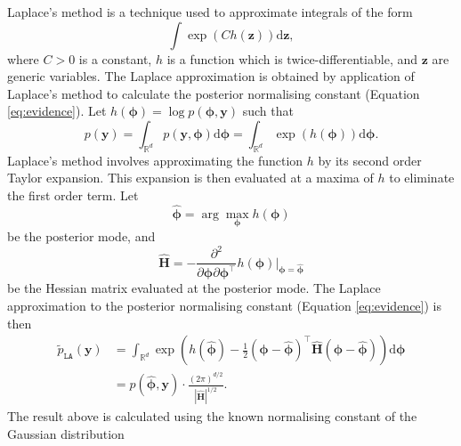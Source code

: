 \documentclass[a4paper, nobind]{templates/ociamthesis}
\begin{document}
Laplace's method \autocite{laplace1774memoire} is a technique used to approximate integrals of the form
\begin{equation}
\int \exp(C h(\mathbf{z})) \text{d}\mathbf{z},
\end{equation}
where \(C > 0\) is a constant, \(h\) is a function which is twice-differentiable, and \(\mathbf{z}\) are generic variables.
The Laplace approximation \autocite{tierney1986accurate} is obtained by application of Laplace's method to calculate the posterior normalising constant (Equation \eqref{eq:evidence}).
Let \(h(\boldsymbol{\mathbf{\phi}}) = \log p(\boldsymbol{\mathbf{\phi}}, \mathbf{y})\) such that
\begin{equation}
p(\mathbf{y}) = \int_{\mathbb{R}^d} p(\mathbf{y}, \boldsymbol{\mathbf{\phi}}) \text{d}\boldsymbol{\mathbf{\phi}} = \int_{\mathbb{R}^d} \exp(h(\boldsymbol{\mathbf{\phi}})) \text{d}\boldsymbol{\mathbf{\phi}}.
\end{equation}
Laplace's method involves approximating the function \(h\) by its second order Taylor expansion.
This expansion is then evaluated at a maxima of \(h\) to eliminate the first order term.
Let
\begin{equation}
\hat{\boldsymbol{\mathbf{\phi}}} = \arg\max_{\boldsymbol{\mathbf{\phi}}} h(\boldsymbol{\mathbf{\phi}}) \label{eq:posterior-mode}
\end{equation}
be the posterior mode, and
\begin{equation}
\hat {\mathbf{H}} = - \frac{\partial^2}{\partial \boldsymbol{\mathbf{\phi}} \partial \boldsymbol{\mathbf{\phi}}^\top} h(\boldsymbol{\mathbf{\phi}}) \rvert_{\boldsymbol{\mathbf{\phi}} = \hat{\boldsymbol{\mathbf{\phi}}}} \label{eq:hessian}
\end{equation}
be the Hessian matrix evaluated at the posterior mode.
The Laplace approximation to the posterior normalising constant (Equation \eqref{eq:evidence}) is then
\begin{align}
\tilde p_{\texttt{LA}}(\mathbf{y}) &= \int_{\mathbb{R}^d} \exp \left( h(\hat{\boldsymbol{\mathbf{\phi}}}) - \frac{1}{2} (\boldsymbol{\mathbf{\phi}} - \hat{\boldsymbol{\mathbf{\phi}}})^\top \hat {\mathbf{H}} (\boldsymbol{\mathbf{\phi}} - \hat{\boldsymbol{\mathbf{\phi}}}) \right) \text{d}\boldsymbol{\mathbf{\phi}} \label{eq:la} \\
&= p(\hat{\boldsymbol{\mathbf{\phi}}}, \mathbf{y}) \cdot \frac{(2 \pi)^{d/2}}{| \hat {\mathbf{H}} |^{1/2}}. \label{eq:la2}
\end{align}
The result above is calculated using the known normalising constant of the Gaussian distribution
\end{document}
